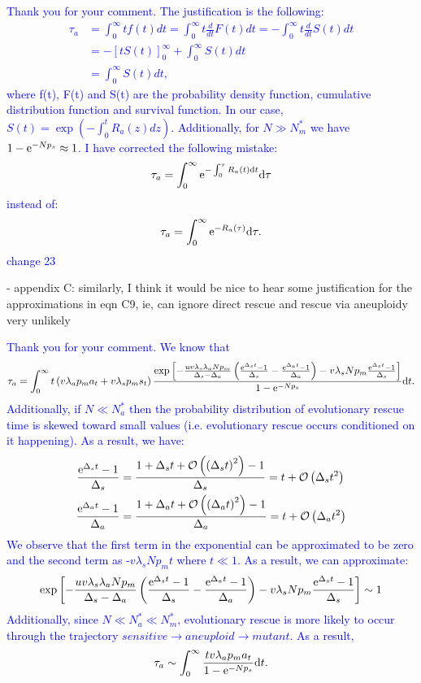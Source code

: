 \documentclass[11pt,a4paper]{article}
\renewcommand{\d}{{\rm d}}
\newcommand{\e}{{\rm e}}
\begin{document}
\textcolor{blue}{Thank you for your comment. The justification is the following: 
\begin{align*}
\tau_a&=\int_0^\infty tf(t)dt=\int_0^\infty t\frac{d}{dt}F(t)dt=-\int_0^\infty t\frac{d}{dt}S(t)dt\\
&=-\left[tS(t)\right]_0^\infty+\int_0^\infty S(t)dt\\
&=\int_0^\infty S(t)dt,
\end{align*}
where f(t), F(t) and S(t) are the probability density function, cumulative distribution function and survival function.
In our case, $S(t)=\exp\left(-\int_0^t R_a(z)dz\right)$. Additionally, for $N\gg N_m^*$ we have $1-\e^{-Np_s}\approx1$. I have corrected the following mistake:
\begin{equation*}
\tau_a=\int_0^\infty \e^{-\int_0^\tau R_a(t)\d t}\d\tau
\end{equation*}
instead of:
\begin{equation*}
\tau_a=\int_0^\infty \e^{-R_a(\tau)}\d\tau.
\end{equation*}
change 23
}

- appendix C: similarly, I think it would be nice to hear some justification for the approximations in eqn C9, ie, can ignore direct rescue and rescue via aneuploidy very unlikely

\textcolor{blue}{Thank you for your comment. We know that
\begin{align*}
\tau_a=\int_0^\infty t\left(v\lambda_ap_ma_t+v\lambda_sp_ms_t\right)\frac{\exp\left[-\frac{uv\lambda_s\lambda_aNp_m}{\Delta_s-\Delta_a}\left(\frac{\e^{\Delta_s t}-1}{\Delta_s}-\frac{\e^{\Delta_a t}-1}{\Delta_a}\right)-v\lambda_sNp_m\frac{\e^{\Delta_s t}-1}{\Delta_s}\right] }{1-\e^{-Np_s}}\d t.
\end{align*}
Additionally, if $N\ll N_a^*$ then the probability distribution of evolutionary rescue time is skewed toward small values (i.e. evolutionary rescue occurs conditioned on it happening). As a result, we have: 
\begin{align*}
\frac{\e^{\Delta_s t}-1}{\Delta_s}&=\frac{1+\Delta_s t+\mathcal{O}\left(\left(\Delta_st\right)^2\right)-1}{\Delta_s}=t+\mathcal{O}\left(\Delta_st^2\right)\\
\frac{\e^{\Delta_a t}-1}{\Delta_a}&=\frac{1+\Delta_a t+\mathcal{O}\left(\left(\Delta_at\right)^2\right)-1}{\Delta_a}=t+\mathcal{O}\left(\Delta_at^2\right)
\end{align*}
We observe that the first term in the exponential can be approximated to be zero and the second term as -$v\lambda_sNp_mt$ where $t\ll1$. As a result, we can approximate:
\begin{equation*}
\exp\left[-\frac{uv\lambda_s\lambda_aNp_m}{\Delta_s-\Delta_a}\left(\frac{\e^{\Delta_s t}-1}{\Delta_s}-\frac{\e^{\Delta_a t}-1}{\Delta_a}\right)-v\lambda_sNp_m\frac{\e^{\Delta_s t}-1}{\Delta_s}\right] \sim 1
\end{equation*}
Additionally, since $N\ll N_a^*\ll N_m^*$, evolutionary rescue is more likely to occur through the trajectory $sensitive \rightarrow aneuploid \rightarrow mutant$. As a result,
\begin{equation*}
\tau_a\sim\int_0^\infty \frac{tv\lambda_ap_ma_t}{1-\e^{-Np_s}}\d t.
\end{equation*}
}
\end{document}
